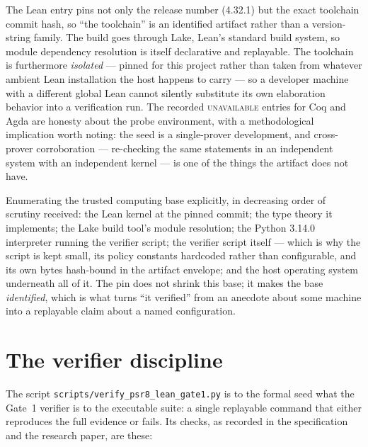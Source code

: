 The Lean entry pins not only the release number (4.32.1) but the exact
toolchain commit hash, so ``the toolchain'' is an identified artifact
rather than a version-string family. The build goes through Lake, Lean's
standard build system, so module dependency resolution is itself
declarative and replayable. The toolchain is furthermore \emph{isolated}
--- pinned for this project rather than taken from whatever ambient
Lean installation the host happens to carry --- so a developer machine
with a different global Lean cannot silently substitute its own
elaboration behavior into a verification run. The recorded
\textsc{unavailable} entries for Coq and Agda are honesty about the
probe environment, with a methodological implication worth noting: the
seed is a single-prover development, and cross-prover corroboration ---
re-checking the same statements in an independent system with an
independent kernel --- is one of the things the artifact does not have.

Enumerating the trusted computing base explicitly, in decreasing order
of scrutiny received: the Lean kernel at the pinned commit; the type
theory it implements; the Lake build tool's module resolution; the
Python 3.14.0 interpreter running the verifier script; the verifier
script itself --- which is why the script is kept small, its policy
constants hardcoded rather than configurable, and its own bytes
hash-bound in the artifact envelope; and the host operating system
underneath all of it. The pin does not shrink this base; it makes the
base \emph{identified}, which is what turns ``it verified'' from an
anecdote about some machine into a replayable claim about a named
configuration.

\section{The verifier discipline}\label{ch11:sec:verifier}

The script \texttt{scripts/verify\_psr8\_lean\_gate1.py} is to the formal
seed what the Gate~1 verifier is to the executable suite: a single
replayable command that either reproduces the full evidence or fails.
Its checks, as recorded in the specification and the research paper,
are these:

